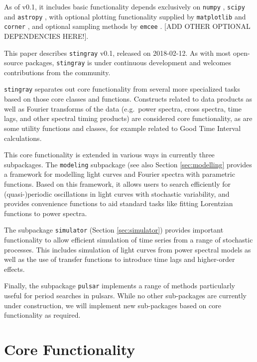 \documentclass[12pt]{emulateapj}
\newcommand{\stingray}{\texttt{stingray}\xspace}
\begin{document}
As of v0.1, it includes basic functionality depends exclusively on \texttt{numpy} \citep{numpy}, \texttt{scipy} \citep{scipy} and \texttt{astropy} \citep{astropy}, with optional plotting functionality supplied by \texttt{matplotlib} \citep{matplotlib} and \texttt{corner} \citep{corner}, and optional sampling methods by \texttt{emcee} \citep{emcee}. [ADD OTHER OPTIONAL DEPENDENCIES HERE!].

This paper describes \stingray v0.1, released on 2018-02-12. 
As with most open-source packages, \stingray is under continuous development and welcomes contributions from the community.

\stingray separates out core functionality from several more specialized tasks based on those core classes and functions. Constructs related to data products as well as Fourier transforms of the data (e.g.\ power spectra, cross spectra, time lags, and other spectral timing products) are considered core functionality, as are some utility functions and classes, for example related to Good Time Interval calculations. 

This core functionality is extended in various ways in currently three subpackages. The \texttt{modeling} subpackage (see also Section \ref{sec:modelling} provides a framework for modelling light curves and Fourier spectra with parametric functions. Based on this framework, it allows users to search efficiently for (quasi-)periodic oscillations in light curves with stochastic variability, and provides convenience functions to aid standard tasks like fitting Lorentzian functions to power spectra. 

The subpackage \texttt{simulator} (Section \ref{sec:simulator}) provides important functionality to allow efficient simulation of time series from a range of stochastic processes. This includes simulation of light curves from power spectral models as well as the use of transfer functions to introduce time lags and higher-order effects. 

Finally, the subpackage \texttt{pulsar} implements a range of methods particularly useful for period searches in pulsars. While no other sub-packages are currently under construction, we will implement new sub-packages based on core functionality as required. 


\section{Core Functionality}
\label{sec:core}
\end{document}
